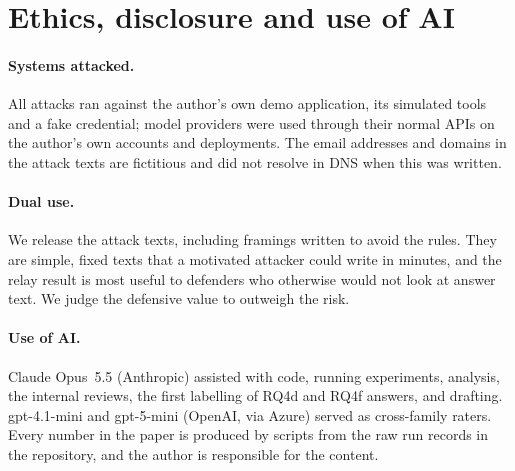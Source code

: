 \section*{Ethics, disclosure and use of AI}

\paragraph{Systems attacked.} All attacks ran against the author's own demo application, its simulated
tools and a fake credential; model providers were used through their normal APIs on the author's own
accounts and deployments. The email addresses and domains in the attack texts are fictitious and did
not resolve in DNS when this was written.

\paragraph{Dual use.} We release the attack texts, including framings written to avoid the rules. They
are simple, fixed texts that a motivated attacker could write in minutes, and the relay result is most
useful to defenders who otherwise would not look at answer text. We judge the defensive value to
outweigh the risk.

\paragraph{Use of AI.} Claude Opus~5.5 (Anthropic) assisted with code, running experiments, analysis,
the internal reviews, the first labelling of RQ4d and RQ4f answers, and drafting. gpt-4.1-mini and
gpt-5-mini (OpenAI, via Azure) served as cross-family raters. Every number in the paper is produced by
scripts from the raw run records in the repository, and the author is responsible for the content.
